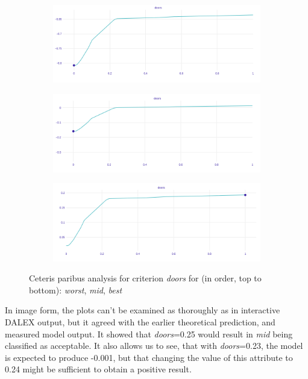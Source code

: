 \documentclass[../main.tex]{subfiles}
\begin{document}
\begin{figure}[H]
    \centering
    \begin{subfigure}[b]{\linewidth}
        \makeatletter{}\makeatother
        \includegraphics[width=\linewidth]{../img/doors_worst.png}
        \label{fig:UTA-ceteris-paribus-doors}
    \end{subfigure}
    \begin{subfigure}[b]{\linewidth}
        \includegraphics[width=\linewidth]{../img/doors_medium.png}
    \end{subfigure}
    \begin{subfigure}[b]{\linewidth}
        \includegraphics[width=\linewidth]{../img/doors_best.png}
    \end{subfigure}
    \caption{Ceteris paribus analysis for criterion \emph{doors} for (in order, top to bottom): \emph{worst}, \emph{mid}, \emph{best}}
\end{figure}

In image form, the plots can't be examined as thoroughly as in interactive DALEX output, but it agreed
with the earlier theoretical prediction, and measured model output. It showed that \emph{doors}=0.25 would result
in \emph{mid} being classified as acceptable. It also allows us to see, that with \emph{doors}=0.23, the
model is expected to produce -0.001, but that changing the value of this attribute to 0.24 might be sufficient to
obtain a positive result.
\end{document}
